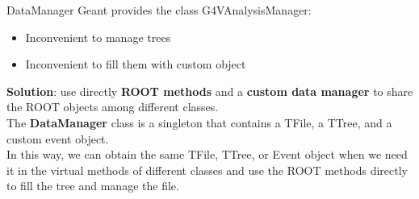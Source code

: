 \documentclass[8pt]{beamer}
\begin{document}
\begin{frame}{DataManager}
Geant provides the class G4VAnalysisManager:
\begin{itemize}
    \item Inconvenient to manage trees
    \item Inconvenient to fill them with custom object
\end{itemize}
\textbf{Solution}: use directly \textbf{ROOT methods} and a \textbf{custom data manager} to share the ROOT objects among different classes.
\\
\vspace{0.8cm}
The \textbf{DataManager} class is a singleton that contains a TFile, a TTree, and a custom event object. \\
\vspace{0.4cm}
In this way, we can obtain the same TFile, TTree, or Event object when we need it in the virtual methods of different classes and use the ROOT methods directly to fill the tree and manage the file. 

    
\end{frame}




\end{document}

